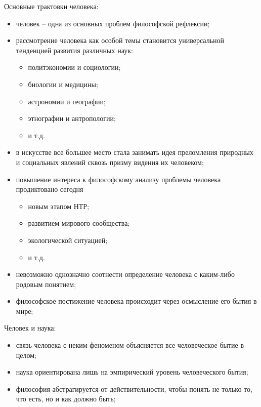 
Основные трактовки человека:
\begin{itemize}
    \item человек -- одна из основных проблем философской рефлексии;
    \item рассмотрение человека как особой темы становится универсальной тенденцией развития различных наук:
    \begin{itemize}
        \item политэкономии и социологии;
        \item биологии и медицины;
        \item астрономии и географии;
        \item этнографии и антропологии;
        \item и т.д.
    \end{itemize}
    \item в искусстве все большее место стала занимать идея преломления природных и социальных явлений 
        сквозь призму видения их человеком;
    \item повышение интереса к философскому анализу проблемы человека продиктовано сегодня
    \begin{itemize}
        \item новым этапом НТР;
        \item развитием мирового сообщества;
        \item экологической ситуацией;
        \item и т.д.
    \end{itemize}
    \item невозможно однозначно соотнести определение человека с каким-либо родовым понятием;
    \item философское постижение человека происходит через осмысление его бытия в мире;
\end{itemize}

Человек и наука:
\begin{itemize}
    \item связь человека с неким феноменом объясняется все человеческое бытие в целом;
    \item наука ориентирована лишь на эмпирический уровень человеческого бытия;
    \item философия абстрагируется от действительности, чтобы понять не только то, что есть, но и как должно 
        быть;
\end{itemize}

